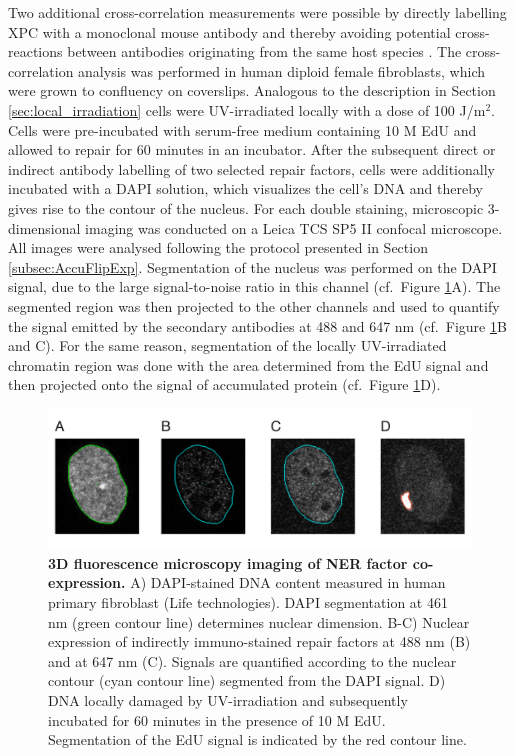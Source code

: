 Two additional cross-correlation measurements were possible by directly labelling XPC with a monoclonal mouse antibody and thereby avoiding potential cross-reactions between antibodies originating from the same host species \cite{Burry2011,Giepmans2006}. The cross-correlation analysis was performed in human diploid female fibroblasts, which were grown to confluency on coverslips. Analogous to the description in Section \ref{sec:local_irradiation} cells were UV-irradiated locally with a dose of 100 J/$\text{m}^\text{2}$. Cells were pre-incubated with serum-free medium containing 10 \textmu M EdU and allowed to repair for 60 minutes in an incubator. After the subsequent direct or indirect antibody labelling of two selected repair factors, cells were additionally incubated with a DAPI solution, which visualizes the cell's DNA and thereby gives rise to the contour of the nucleus. For each double staining, microscopic 3-dimensional imaging was conducted on a Leica TCS SP5 II confocal microscope. All images were analysed following the protocol presented in Section \ref{subsec:AccuFlipExp}. Segmentation of the nucleus was performed on the DAPI signal, due to the large signal-to-noise ratio in this channel (cf.\ Figure \ref{fig:coStaining}A). The segmented region was then projected to the other channels and used to quantify the signal emitted by the secondary antibodies at 488 and 647 nm (cf.\ Figure \ref{fig:coStaining}B and C). For the same reason, segmentation of the locally UV-irradiated chromatin region was done with the area determined from the EdU signal and then projected onto the signal of accumulated protein (cf.\ Figure \ref{fig:coStaining}D).   

\begin{figure}[t!]
	\begin{center}
		\includegraphics[width=1\textwidth]{Abbildungen/figure4_1.pdf}
		\caption{\textbf{3D fluorescence microscopy imaging of NER factor co-expression.} A) DAPI-stained DNA content measured in human primary fibroblast (Life technologies). DAPI segmentation at 461 nm  (green contour line) determines nuclear dimension. B-C) Nuclear expression of indirectly immuno-stained repair factors at 488 nm (B) and at 647 nm (C). Signals are quantified according to the nuclear contour (cyan contour line) segmented from the DAPI signal. D) DNA locally damaged by UV-irradiation and subsequently incubated for 60 minutes in the presence of 10 \textmu M EdU. Segmentation of the EdU signal is indicated by the red contour line.   }
		\label{fig:coStaining}
	\end{center}
\end{figure}

